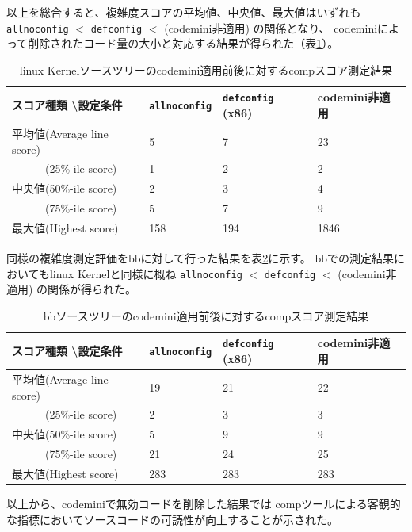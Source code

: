 \par
以上を総合すると、複雑度スコアの平均値、中央値、最大値はいずれも \verb|allnoconfig| $<$ \verb|defconfig| $<$ (\acrshort{codemini}非適用) の関係となり、
\acrshort{codemini}によって削除されたコード量の大小と対応する結果が得られた（表\ref{kcomp}）。
\begin{table}[H]
  \caption{\acrshort{linux} Kernelソースツリーの\acrshort{codemini}適用前後に対する\acrshort{comp}スコア測定結果}
  \label{kcomp}
  \centering
  \begin{tabular}{l|lll}
    \normalsize{スコア種類 \textbackslash 設定条件} & \verb|allnoconfig| & \verb|defconfig| (x86) & \acrshort{codemini}非適用 \\
    \hline 
    平均値(Average line score) & 5 & 7 & 23 \\
    　　　(25\%-ile score) & 1 & 2 & 2 \\
    中央値(50\%-ile score) & 2 & 3 & 4 \\
    　　　(75\%-ile score) & 5 & 7 & 9 \\
    最大値(Highest score) & 158 & 194 & 1846
  \end{tabular}
\end{table}
\par
同様の複雑度測定評価を\acrshort{bb}に対して行った結果を表\ref{bcomp}に示す。
\acrshort{bb}での測定結果においても\acrshort{linux} Kernelと同様に概ね \verb|allnoconfig| $<$ \verb|defconfig| $<$ (\acrshort{codemini}非適用) の関係が得られた。
\begin{table}[H]
  \caption{\acrshort{bb}ソースツリーの\acrshort{codemini}適用前後に対する\acrshort{comp}スコア測定結果}
  \label{bcomp}
  \centering
  \begin{tabular}{l|lll}
    \normalsize{スコア種類 \textbackslash 設定条件} & \verb|allnoconfig| & \verb|defconfig| (x86) & \acrshort{codemini}非適用 \\
    \hline 
    平均値(Average line score) & 19 & 21 & 22 \\
    　　　(25\%-ile score) & 2 & 3 & 3 \\
    中央値(50\%-ile score) & 5 & 9 & 9 \\
    　　　(75\%-ile score) & 21 & 24 & 25 \\
    最大値(Highest score) & 283 & 283 & 283
  \end{tabular}
\end{table}
\par
以上から、\acrshort{codemini}で無効コードを削除した結果では
\acrshort{comp}ツールによる客観的な指標においてソースコードの可読性が向上することが示された。

